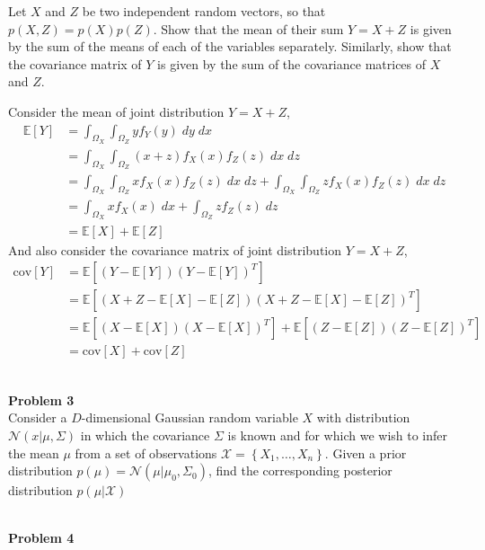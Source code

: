\documentclass{article}
\begin{document}
Let $X$ and $Z$ be two independent random vectors, so that $p(X, Z) = p(X)p(Z)$. Show that the mean of their sum $Y = X+Z$ is given by the sum of the means of each of the variables separately. Similarly, show that the covariance matrix of $Y$ is given by the sum of the covariance matrices of $X$ and $Z$.
\color{blue}
\begin{sol}
    Consider the mean of joint distribution $Y = X+Z$,
\begin{align*}
    \mathbb{E}[Y] &= \int_{\Omega_X}\int_{\Omega_Z}yf_{Y}(y)\;dy\;dx\\
    &= \int_{\Omega_X}\int_{\Omega_Z}(x+z)f_{X}(x)f_{Z}(z)\;dx\;dz\\
    &= \int_{\Omega_X}\int_{\Omega_Z}xf_{X}(x)f_{Z}(z)\;dx\;dz + \int_{\Omega_X}\int_{\Omega_Z}zf_{X}(x)f_{Z}(z)\;dx\;dz\\
    &= \int_{\Omega_X}xf_{X}(x)\;dx + \int_{\Omega_Z}zf_{Z}(z)\;dz\\
    &= \mathbb{E}[X] + \mathbb{E}[Z]
\end{align*}
And also consider the covariance matrix of joint distribution $Y = X+Z$,
\begin{align*}
    \text{cov}[Y] &= \mathbb{E}\left[\left(Y-\mathbb{E}[Y]\right)\left(Y-\mathbb{E}[Y]\right)^T\right]\\
    &= \mathbb{E}\left[\left(X+Z-\mathbb{E}[X]-\mathbb{E}[Z]\right)\left(X+Z-\mathbb{E}[X]-\mathbb{E}[Z]\right)^T\right]\\
    &= \mathbb{E}\left[\left(X-\mathbb{E}[X]\right)\left(X-\mathbb{E}[X]\right)^T\right] + \mathbb{E}\left[\left(Z-\mathbb{E}[Z]\right)\left(Z-\mathbb{E}[Z]\right)^T\right]\\
    &= \text{cov}[X] + \text{cov}[Z]
\end{align*}
\end{sol}
\color{black}
\leavevmode\\
\noindent
\Large{\textbf{Problem 3}}\normalsize
\\

Consider a $D$-dimensional Gaussian random variable $X$ with distribution $\mathcal{N}(x|\mu,\Sigma)$ in which the covariance $\Sigma$ is known and for which we wish to infer the mean $\mu$ from a set of observations $\mathcal{X} = \left\{X_1,\dots,X_n\right\}$. Given a prior distribution $p(\mu) =\mathcal{N}\left(\mu|\mu_0,\Sigma_0\right) $, find the corresponding posterior distribution $p(\mu|\mathcal{X})$

\leavevmode\\
\noindent
\Large{\textbf{Problem 4}}\normalsize
\\
\end{document}
